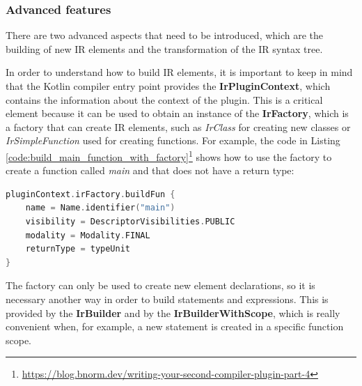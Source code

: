 \subsubsection{Advanced features}\label{section:compiler_plugin_advaced}
There are two advanced aspects that need to be introduced, which are the building of new IR elements and the transformation of the IR syntax tree.

In order to understand how to build IR elements, it is important to keep in mind that the Kotlin compiler entry point provides the \textbf{IrPluginContext}, which contains the information about the context of the plugin. This is a critical element because it can be used to obtain an instance of the \textbf{IrFactory}, which is a factory that can create IR elements, such as \textit{IrClass} for creating new classes or \textit{IrSimpleFunction} used for creating functions.\newline
For example, the code in Listing \ref{code:build_main_function_with_factory}\footnote{\url{https://blog.bnorm.dev/writing-your-second-compiler-plugin-part-4}} shows how to use the factory to create a function called \textit{main} and that does not have a return type:
\begin{lstlisting}[caption={Main function IR building by using the IrFactory}, captionpos=b, language=Kotlin, label={code:build_main_function_with_factory}]
pluginContext.irFactory.buildFun {
    name = Name.identifier("main")
    visibility = DescriptorVisibilities.PUBLIC
    modality = Modality.FINAL
    returnType = typeUnit
}        
\end{lstlisting}

The factory can only be used to create new element declarations, so it is necessary another way in order to build statements and expressions. This is provided by the \textbf{IrBuilder} and by the \textbf{IrBuilderWithScope}, which is really convenient when, for example, a new statement is created in a specific function scope.

